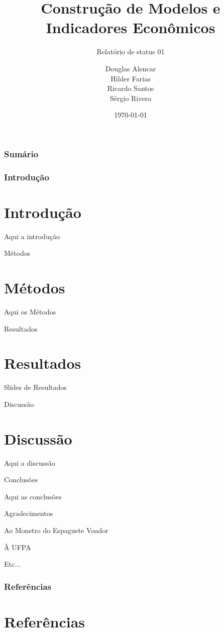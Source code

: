 \documentclass[11pt]{beamer}
\author{Douglas Alencar\\
		Hilder Farias\\
		Ricardo Santos\\
		Sérgio Rivero}
\title{Construção de Modelos e Indicadores Econômicos}
\subtitle{Relatório de status 01}
\institute{PPGE-FACECON-ICSA}
\date{\today}
\begin{document}
\begin{frame}
\titlepage
\end{frame}


\begin{frame}
\frametitle{Sumário}
\begin{multicols}{2}
		\tableofcontents
\end{multicols}
\end{frame}





\begin{frame}
\frametitle{Introdução}
\section{Introdução}
Aqui a introdução

\cite{Coutinho2016,DeLima2018,Vogt2016}
\end{frame}



\begin{frame}{Métodos}
\section{Métodos}

Aqui os Métodos 
\cite{Almeida2017,Almeida2009a}

\end{frame}


\begin{frame}{Resultados}
\section{Resultados}

Slides de Resultados


\end{frame}


\begin{frame}{Discussão}
\section{Discussão}

Aqui a discussão

\end{frame}



\begin{frame}{Conclusões}

Aqui as conclusões

\end{frame}


\begin{frame}{Agradecimentos}

Ao Monstro do Espaguete Voador

À UFPA

Etc...

\end{frame}

\begin{frame}[allowframebreaks]
\frametitle{Referências}
       \section{Referências}



\end{frame}
\end{document}
